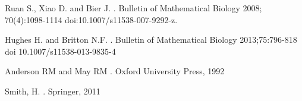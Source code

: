 \documentclass[12pt,leqno]{article}
\begin{document}
\begin{thebibliography}{10}
%
%
%
%
%
%
%
%
%

Ruan S., Xiao D. and Bier J.
.
\newblock Bulletin of Mathematical Biology 2008; 70(4):1098-1114 
\newblock doi:10.1007/s11538-007-9292-z.

Hughes H. and Britton N.F.
.
\newblock Bulletin of Mathematical Biology 2013;75:796-818  
\newblock doi 10.1007/s11538-013-9835-4

Anderson RM and May RM
.
\newblock Oxford University Press, 1992

Smith, H.
.
\newblock Springer, 2011
\end{thebibliography}
\end{document}
